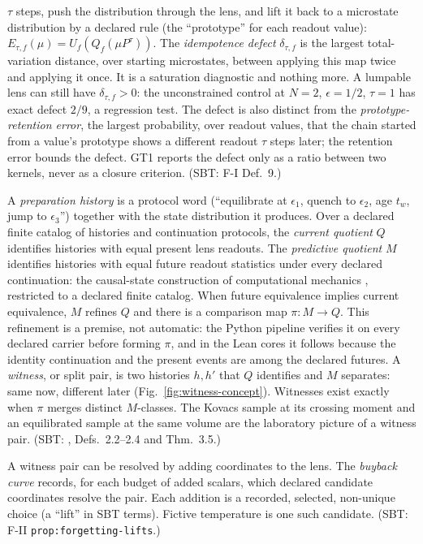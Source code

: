 \begin{description}[leftmargin=1.5em, itemsep=4pt]
    $\tau$ steps, push the distribution through the lens, and lift it back to a microstate
    distribution by a declared rule (the ``prototype'' for each readout value):
    $E_{\tau,f}(\mu) = U_f(Q_f(\mu P^{\tau}))$. The \emph{idempotence defect} $\delta_{\tau,f}$
    is the largest total-variation distance, over starting microstates, between applying this map
    twice and applying it once. It is a saturation diagnostic and nothing more. A lumpable lens
    can still have $\delta_{\tau,f} > 0$: the unconstrained control at $N=2$, $\epsilon=1/2$,
    $\tau=1$ has exact defect $2/9$, a regression test. The defect is also distinct from the
    \emph{prototype-retention error}, the largest probability, over readout values, that the
    chain started from a value's prototype shows a different readout $\tau$ steps later; the
    retention error bounds the defect. GT1 reports the defect only as a ratio
    between two kernels, never as a closure criterion. (SBT: F-I Def.~9.)
  \item[Preparation histories, quotients, and witnesses.] A \emph{preparation history} is a
    protocol word (``equilibrate at $\epsilon_1$, quench to $\epsilon_2$, age $t_w$, jump to
    $\epsilon_3$'') together with the state distribution it produces. Over a declared finite
    catalog of histories and continuation protocols, the \emph{current quotient} $Q$ identifies
    histories with equal present lens readouts. The \emph{predictive quotient} $M$ identifies
    histories with equal future readout statistics under every declared continuation: the
    causal-state construction of computational mechanics
    \cite{crutchfield-young-1989,shalizi-crutchfield-2001,shalizi-moore-2025}, restricted to a
    declared finite catalog. When future equivalence implies current equivalence, $M$ refines $Q$
    and there is a comparison map $\pi: M \to Q$. This refinement is a premise, not automatic:
    the Python pipeline verifies it on every declared carrier before forming $\pi$, and in the
    Lean cores it follows because the identity continuation and the present events are among the
    declared futures. A \emph{witness}, or split pair, is two histories $h, h'$ that $Q$ identifies
    and $M$ separates: same now, different later (Fig.~\ref{fig:witness-concept}). Witnesses exist
    exactly when $\pi$ merges distinct $M$-classes. The Kovacs sample at its crossing moment and
    an equilibrated sample at the same volume are the laboratory picture of a witness pair.
    (SBT: , Defs.~2.2--2.4 and Thm.~3.5.)
  \item[Memory coordinates and buyback.] A witness pair can be resolved by adding coordinates to
    the lens. The \emph{buyback curve} records, for each budget of added scalars, which declared
    candidate coordinates resolve the pair. Each addition is a recorded, selected, non-unique
    choice (a ``lift'' in SBT terms). Fictive temperature is one such candidate. (SBT: F-II
    \texttt{prop:forgetting-lifts}.)
\end{description}

